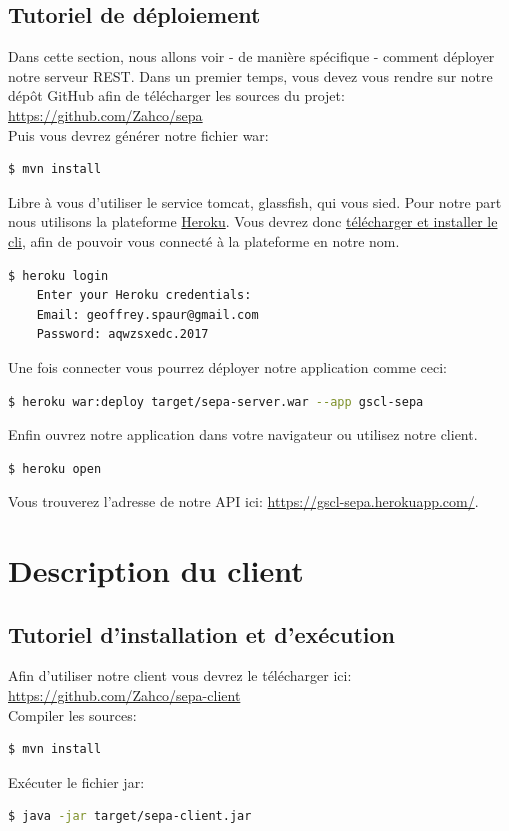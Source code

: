 \documentclass{article}
\begin{document}
    \subsection{Tutoriel de déploiement}
      Dans cette section, nous allons voir - de manière spécifique - comment déployer notre serveur REST.
      Dans un premier temps, vous devez vous rendre sur notre dépôt GitHub afin de télécharger les sources du projet:\\
      \url{https://github.com/Zahco/sepa}\\
      Puis vous devrez générer notre fichier war:
      \begin{lstlisting}[language=bash]
    $ mvn install
      \end{lstlisting}
      Libre à vous d'utiliser le service tomcat, glassfish, qui vous sied. Pour notre part nous utilisons la plateforme \href{https://www.heroku.com}{Heroku}.
      Vous devrez donc \href{https://devcenter.heroku.com/articles/heroku-cli}{télécharger et installer le cli}, afin de pouvoir vous connecté à la plateforme en notre nom.
      \begin{lstlisting}[language=bash]
    $ heroku login
    Enter your Heroku credentials:
    Email: geoffrey.spaur@gmail.com
    Password: aqwzsxedc.2017
      \end{lstlisting}
      Une fois connecter vous pourrez déployer notre application comme ceci:
      \begin{lstlisting}[language=bash]
    $ heroku war:deploy target/sepa-server.war --app gscl-sepa
      \end{lstlisting}
      Enfin ouvrez notre application dans votre navigateur ou utilisez notre client.
      \begin{lstlisting}[language=bash]
    $ heroku open
      \end{lstlisting}
      Vous trouverez l’adresse de notre API ici: \url{https://gscl-sepa.herokuapp.com/}.

  \newpage

  \section{ Description du client}
    \subsection{Tutoriel d'installation et d’exécution}
      Afin d'utiliser notre client vous devrez le télécharger ici:\\
      \url{https://github.com/Zahco/sepa-client}\\
      Compiler les sources: 
      \begin{lstlisting}[language=bash]
    $ mvn install
      \end{lstlisting}
      Exécuter le fichier jar:
      \begin{lstlisting}[language=bash]
    $ java -jar target/sepa-client.jar
      \end{lstlisting}
\end{document}
